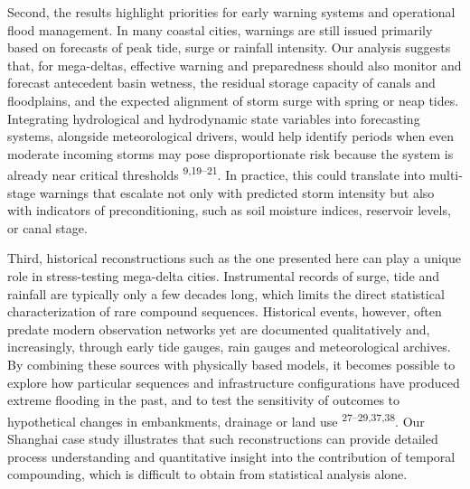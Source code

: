 \documentclass[
]{article}
\begin{document}
Second, the results highlight priorities for early warning systems and
operational flood management. In many coastal cities, warnings are still
issued primarily based on forecasts of peak tide, surge or rainfall
intensity. Our analysis suggests that, for mega-deltas, effective
warning and preparedness should also monitor and forecast antecedent
basin wetness, the residual storage capacity of canals and floodplains,
and the expected alignment of storm surge with spring or neap tides.
Integrating hydrological and hydrodynamic state variables into
forecasting systems, alongside meteorological drivers, would help
identify periods when even moderate incoming storms may pose
disproportionate risk because the system is already near critical
thresholds \textsuperscript{9,19--21}. In practice, this could translate
into multi-stage warnings that escalate not only with predicted storm
intensity but also with indicators of preconditioning, such as soil
moisture indices, reservoir levels, or canal stage.

Third, historical reconstructions such as the one presented here can
play a unique role in stress-testing mega-delta cities. Instrumental
records of surge, tide and rainfall are typically only a few decades
long, which limits the direct statistical characterization of rare
compound sequences. Historical events, however, often predate modern
observation networks yet are documented qualitatively and, increasingly,
through early tide gauges, rain gauges and meteorological archives. By
combining these sources with physically based models, it becomes
possible to explore how particular sequences and infrastructure
configurations have produced extreme flooding in the past, and to test
the sensitivity of outcomes to hypothetical changes in embankments,
drainage or land use \textsuperscript{27--29,37,38}. Our Shanghai case
study illustrates that such reconstructions can provide detailed process
understanding and quantitative insight into the contribution of temporal
compounding, which is difficult to obtain from statistical analysis
alone.
\end{document}
